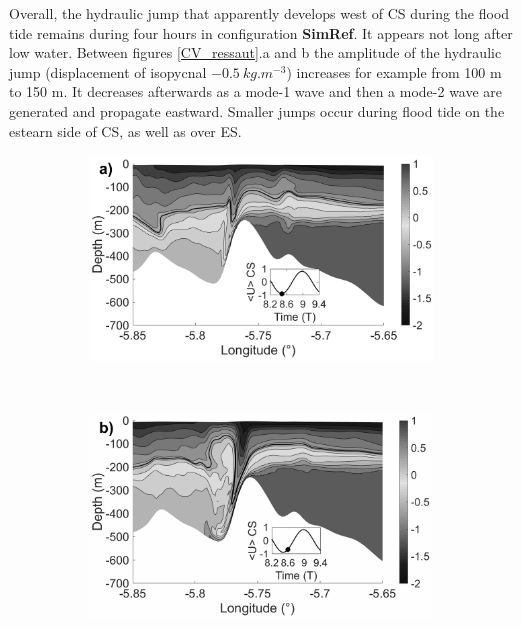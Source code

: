 Overall, the hydraulic jump that apparently develops west of CS during the flood tide remains during four hours in configuration \textbf{SimRef}. It appears not long after low water. Between figures \ref{CV_ressaut}.a and b the amplitude of the hydraulic jump (displacement of isopycnal $-0.5\ kg.m^{-3}$) increases for example from 100 m to 150 m. It decreases afterwards as a mode-1 wave and then a mode-2 wave are generated and propagate eastward. Smaller jumps occur during flood tide on the estearn side of CS, as well as over ES. \\


\begin{figure}[!h]
\begin{subfigure}{0.5\linewidth}
\includegraphics[width=\textwidth]{./papier2D/RW_J4_9h12_ref.png}
\end{subfigure}
 ~
\begin{subfigure}{0.5\linewidth}
  \includegraphics[width=\textwidth]{./papier2D/RW_J4_10h36_ressautebb.png}

\end{subfigure}
 

\end{figure}
